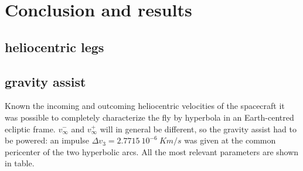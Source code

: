 \section{Conclusion and results}
\label{sec:conclusion}
\subsection{heliocentric legs}
\label{subsec:heliocentric}
\subsection{gravity assist}
\label{subsec:ga}
Known the incoming and outcoming heliocentric velocities of the spacecraft it was possible to completely characterize the 
fly by hyperbola in an Earth-centred ecliptic frame. $v_{\infty}^{-}$ and $v_{\infty}^{+}$ will in general be different, so
the gravity assist had to be powered: an impulse $\Delta v_{3}=2.7715 \ 10^{-6}  \ Km/s $ was given at the common pericenter
of the two hyperbolic arcs. All the most relevant parameters are shown in table.
\cite{curtis_book}